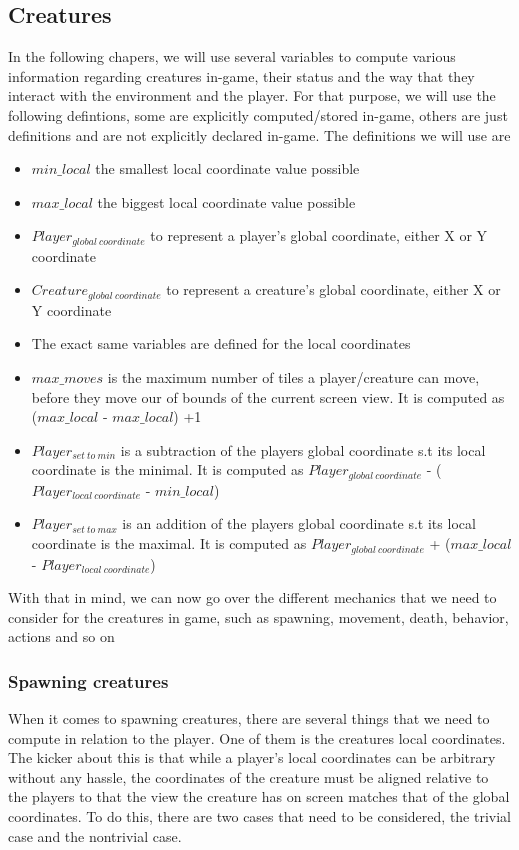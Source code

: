 \documentclass{report}
\begin{document}
\subsection{Creatures}
In the following chapers, we will use several variables to compute various information regarding creatures in-game, their status and the way
that they interact with the environment and the player. For that purpose, we will use the following defintions, some are explicitly computed/stored in-game, others are just definitions and are not explicitly declared in-game. The definitions we will use are
\begin{itemize}
\item $min\_local$ the smallest local coordinate value possible 
\item $max\_local$ the biggest local coordinate value possible 
\item $Player_{global  \:coordinate}$  to represent a player's global coordinate, either X or Y coordinate 
\item $Creature_{global \: coordinate}$ to represent a creature's global coordinate, either X or Y coordinate 
\item The exact same variables are defined for the local coordinates 
\item $max\_moves$ is the maximum number of tiles a player/creature can move, before they move our of bounds of the current screen view. It is computed as  ($max\_local$ - $max\_local$) +1 
\item $Player_{set \: to \: min}$  is a subtraction of the players global coordinate s.t its local coordinate is the minimal. It is computed as  $Player_{global \: coordinate}$ - ($Player_{local \: coordinate}$ - $min\_local$)
\item $Player_{set \: to \: max}$  is an addition of the players global coordinate s.t its local coordinate is the maximal. It is computed as  $Player_{global \: coordinate}$ + ($max\_local$ - $Player_{local \: coordinate}$)
\end{itemize}
With that in mind, we can now go over the different mechanics that we need to consider for the creatures in game, such as spawning, movement, death, behavior, actions and so on

\subsubsection{Spawning creatures}
When it comes to spawning creatures, there are several things that we need to compute in relation to the player. One of them is the creatures local coordinates. The kicker about this is that while a player's local coordinates can be arbitrary without any hassle, the coordinates of the creature must be aligned relative to the players to that the view the creature has on screen matches that of the global coordinates. To do this, there are two cases that need to be considered, the trivial case and the nontrivial case. \newline
\end{document}
